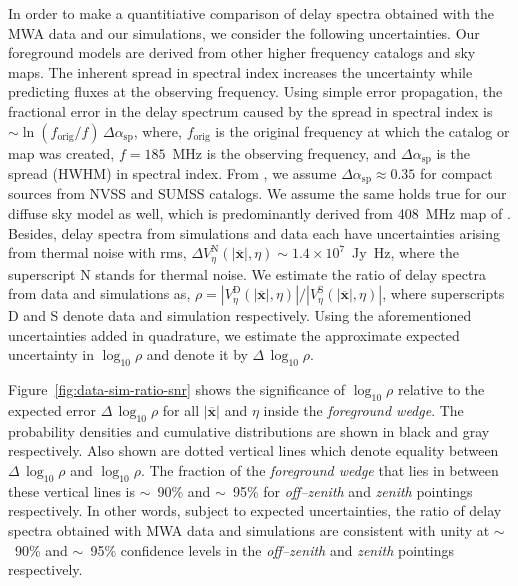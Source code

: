 \documentclass[preprint2,iop,numberedappendix]{emulateapj}
\begin{document}
In order to make a quantitiative comparison of delay spectra obtained with the MWA data and our simulations, we consider the following uncertainties. Our foreground models are derived from other higher frequency catalogs and sky maps. The inherent spread in spectral index increases the uncertainty while predicting fluxes at the observing frequency. Using simple error propagation, the fractional error in the delay spectrum caused by the spread in spectral index is $\sim \ln(f_\textrm{orig}/f)\,\Delta\alpha_\textrm{sp}$, where, $f_\textrm{orig}$ is the original frequency at which the catalog or map was created, $f=185$~MHz is the observing frequency, and $\Delta\alpha_\textrm{sp}$ is the spread (HWHM) in spectral index. From \citet{mau03}, we assume $\Delta\alpha_\textrm{sp} \approx 0.35$ for compact sources from NVSS and SUMSS catalogs. We assume the same holds true for our diffuse sky model as well, which is predominantly derived from 408~MHz map of \citet{has82}. Besides, delay spectra from simulations and data each have uncertainties arising from thermal noise with rms, $\Delta V^\textrm{N}_\eta(|\overline{\mathbf{x}}|,\eta) \sim 1.4\times 10^7$~Jy~Hz, where the superscript N stands for thermal noise. We estimate the ratio of delay spectra from data and simulations as, $\rho = |V^\textrm{D}_\eta(|\overline{\mathbf{x}}|,\eta)|/|V^\textrm{S}_\eta(|\overline{\mathbf{x}}|,\eta)|$, where superscripts D and S denote data and simulation respectively. Using the aforementioned uncertainties added in quadrature, we estimate the approximate expected uncertainty in $\log_{10}\rho$ and denote it by $\Delta\,\log_{10}\rho$. 

Figure~\ref{fig:data-sim-ratio-snr} shows the significance of $\log_{10}\rho$ relative to the expected error $\Delta\,\log_{10}\rho$ for all $|\overline{\mathbf{x}}|$ and $\eta$ inside the {\it foreground wedge}. The probability densities and cumulative distributions are shown in black and gray respectively. Also shown are dotted vertical lines which denote equality between $\Delta\,\log_{10}\rho$ and $\log_{10}\rho$. The fraction of the {\it foreground wedge} that lies in between these vertical lines is $\sim$~90\% and $\sim$~95\% for {\it off--zenith} and {\it zenith} pointings respectively. In other words, subject to expected uncertainties, the ratio of delay spectra obtained with MWA data and simulations are consistent with unity at $\sim$~90\% and $\sim$~95\% confidence levels in the {\it off--zenith} and {\it zenith} pointings respectively.
\end{document}
